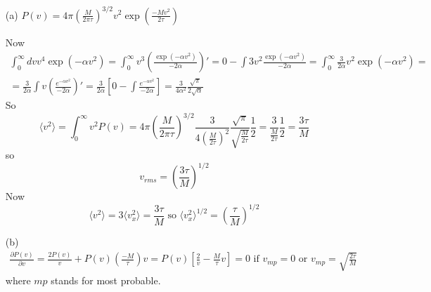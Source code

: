 \documentclass[twoside]{amsart}
\theoremstyle{plain}
\theoremstyle{definition}
\begin{document}
\begin{enumerate}
  \item[(a)] $P(v) = 4\pi \left( \frac{M}{2\pi \tau} \right)^{3/2} v^2 \exp{ \left( \frac{-Mv^2}{2\tau} \right) }$

Now
\[
\begin{gathered}
  \int_0^{\infty} dv v^4 \exp{ (-\alpha v^2 )} = \int_0^{\infty} v^3 \left( \frac{ \exp{ (-\alpha v^2) } }{ -2 \alpha } \right)' = 0 - \int 3v^2 \frac{ \exp{ (-\alpha v^2)} }{ -2\alpha } = \int_0^{\infty} \frac{3}{2\alpha} v^2 \exp{ (-\alpha v^2 )} = \\
  = \frac{3}{2\alpha } \int v \left( \frac{e^{-\alpha v^2 }}{ -2\alpha } \right)' = \frac{3}{2\alpha } \left[ 0 - \int \frac{e^{-\alpha v^2 } }{ -2\alpha } \right] = \frac{3}{4\alpha^2 } \frac{ \sqrt{ \pi }}{ 2\sqrt{ \alpha }}
\end{gathered}
\]
So
\[
\langle v^2 \rangle = \int_0^{\infty} v^2 P(v) = 4\pi \left( \frac{M}{2\pi \tau } \right)^{3/2} \frac{3}{4 \left( \frac{M}{2\tau} \right)^2 } \frac{ \sqrt{\pi }}{ \sqrt{ \frac{M}{2\tau} } } \frac{1}{2} = \frac{3}{ \frac{M}{2\tau} } \frac{1}{2} = \frac{3\tau }{M}
\]
so 
\[
\boxed{ v_{rms} = \left( \frac{3\tau}{M} \right)^{1/2} }
\]
Now
\[
\langle v^2 \rangle = 3\langle v_x^2 \rangle = \frac{3\tau}{M} \text{ so } \langle v_x^2 \rangle^{1/2} = \left( \frac{\tau}{M} \right)^{1/2}
\]
  \item[(b)] \[
\begin{gathered}
  \frac{ \partial P(v) }{ \partial v} = \frac{2 P(v)}{v} + P(v) \left( \frac{-M}{\tau} \right)v = P(v) \left[ \frac{2}{v} - \frac{M}{\tau}v \right] = 0  \text{ if } v_{mp} = 0 \text{ or } v_{mp} = \boxed{ \sqrt{ \frac{2\tau}{M} } }
\end{gathered}
\]
where $mp$ stands for most probable.  


\end{enumerate}
\end{document}
